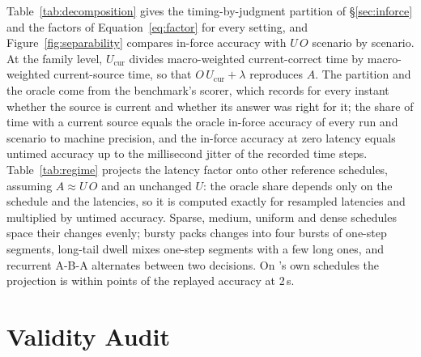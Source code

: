 Table~\ref{tab:decomposition} gives the timing-by-judgment partition of \S\ref{sec:inforce} and the factors of Equation~\eqref{eq:factor} for every setting, and Figure~\ref{fig:separability} compares in-force accuracy with $U\,O$ scenario by scenario.
At the family level, $U_{\mathrm{cur}}$ divides macro-weighted current-correct time by macro-weighted current-source time, so that $O\,U_{\mathrm{cur}}+\lambda$ reproduces $A$.
The partition and the oracle come from the benchmark's scorer, which records for every instant whether the source is current and whether its answer was right for it; the share of time with a current source equals the oracle in-force accuracy of every run and scenario to machine precision, and the in-force accuracy at zero latency equals untimed accuracy up to the millisecond jitter of the recorded time steps.
Table~\ref{tab:regime} projects the latency factor onto other reference schedules, assuming $A\approx U\,O$ and an unchanged $U$: the oracle share depends only on the schedule and the latencies, so it is computed exactly for resampled latencies and multiplied by untimed accuracy.
Sparse, medium, uniform and dense schedules space their changes evenly; bursty packs \RegimeBurstyChanges{} changes into four bursts of one-step segments, long-tail dwell mixes one-step segments with a few long ones, and recurrent A-B-A alternates between two decisions.
On \sdb's own schedules the projection is within \RegimeLiteMaxDiff{} points of the replayed accuracy at 2\,s.

\section{Validity Audit}
\label{app:audit}

